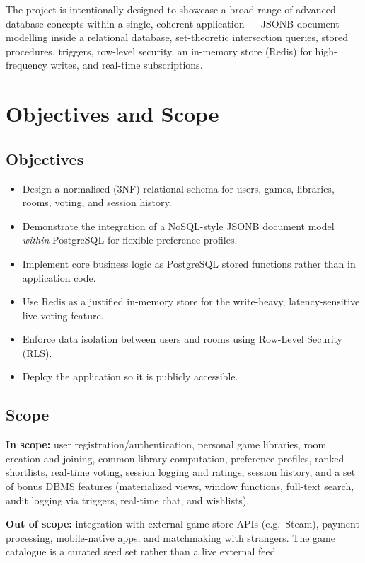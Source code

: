\documentclass[11pt,a4paper]{article}
\begin{document}
The project is intentionally designed to showcase a broad range of advanced
database concepts within a single, coherent application --- JSONB document
modelling inside a relational database, set-theoretic intersection queries,
stored procedures, triggers, row-level security, an in-memory store (Redis)
for high-frequency writes, and real-time subscriptions.

\section{Objectives and Scope}
\subsection{Objectives}
\begin{itemize}[leftmargin=1.4em]
  \item Design a normalised (3NF) relational schema for users, games, libraries,
        rooms, voting, and session history.
  \item Demonstrate the integration of a NoSQL-style JSONB document model
        \emph{within} PostgreSQL for flexible preference profiles.
  \item Implement core business logic as PostgreSQL stored functions rather than
        in application code.
  \item Use Redis as a justified in-memory store for the write-heavy, latency-sensitive
        live-voting feature.
  \item Enforce data isolation between users and rooms using Row-Level Security (RLS).
  \item Deploy the application so it is publicly accessible.
\end{itemize}

\subsection{Scope}
\textbf{In scope:} user registration/authentication, personal game libraries,
room creation and joining, common-library computation, preference profiles,
ranked shortlists, real-time voting, session logging and ratings, session
history, and a set of bonus DBMS features (materialized views, window functions,
full-text search, audit logging via triggers, real-time chat, and wishlists).

\textbf{Out of scope:} integration with external game-store APIs (e.g.\ Steam),
payment processing, mobile-native apps, and matchmaking with strangers. The game
catalogue is a curated seed set rather than a live external feed.
\end{document}
